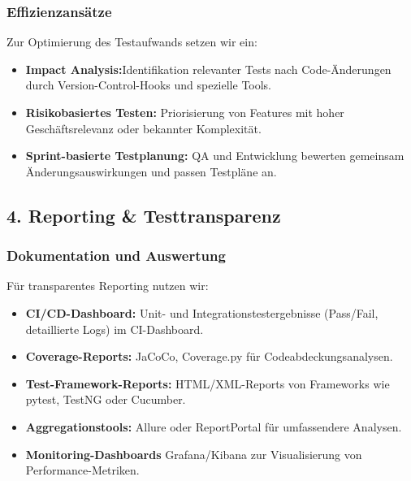 \subsubsection{Effizienzansätze}
Zur Optimierung des Testaufwands setzen wir ein:
\begin{itemize}
    \item \textbf{Impact Analysis:}Identifikation relevanter Tests nach Code-Änderungen durch Version-Control-Hooks und spezielle Tools.
    \item \textbf{Risikobasiertes Testen:} Priorisierung von Features mit hoher Geschäftsrelevanz oder bekannter Komplexität.
    \item \textbf{Sprint-basierte Testplanung:} QA und Entwicklung bewerten gemeinsam Änderungsauswirkungen und passen Testpläne an.
\end{itemize}
\subsection{4. Reporting \& Testtransparenz}
\subsubsection{Dokumentation und Auswertung}
Für transparentes Reporting nutzen wir:
\begin{itemize}
    \item \textbf{CI/CD-Dashboard:} Unit- und Integrationstestergebnisse (Pass/Fail, detaillierte Logs) im CI-Dashboard.
    \item \textbf{Coverage-Reports:} JaCoCo, Coverage.py für Codeabdeckungsanalysen.
    \item \textbf{Test-Framework-Reports:} HTML/XML-Reports von Frameworks wie pytest, TestNG oder Cucumber.
    \item \textbf{Aggregationstools:} Allure oder ReportPortal für umfassendere Analysen.
    \item \textbf{Monitoring-Dashboards} Grafana/Kibana zur Visualisierung von Performance-Metriken.
\end{itemize}
